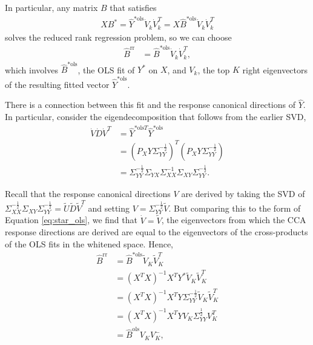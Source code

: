 \documentclass{article}
\begin{document}
In particular, any matrix $B$ that satisfies
\begin{align*}
  XB^{\ast} = \hat{Y}^{\ast \text{ols}}\dot{V}_{k}\dot{V}_{k}^{T} = X\hat{B}^{\ast \text{ols}}\dot{V}_{k}\dot{V}_{k}^{T}
\end{align*}
solves the reduced rank regression problem, so we can choose
\begin{align}
  \hat{B}^{\text{rr}} &= \hat{B}^{\ast \text{ols}}\dot{V}_{k}\dot{V}_{k}^{T}, \label{eq:brr_coef}
\end{align}
which involves $\hat{B}^{\ast \text{ols}}$, the OLS fit of $Y^{\ast}$ on $X$, and
$V_{k}$, the top $K$ right eigenvectors of the resulting fitted vector
$\hat{Y}^{\ast \text{ols}}$.

There is a connection between this fit and the response canonical directions of
$\hat{Y}$. In particular, consider the eigendecomposition that follows from the
earlier SVD,
\begin{align}
\dot{V}\dot{D}\dot{V}^{T} &=   \hat{Y}^{\ast \text{ols} T}  \hat{Y}^{\ast \text{ols}} \nonumber \\
&= \left(P_{X}Y\Sigma_{YY}^{-\frac{1}{2}}\right)^{T}\left(P_{X}Y\Sigma_{YY}^{-\frac{1}{2}}\right)\nonumber \\
  &= \Sigma_{YY}^{-\frac{1}{2}}\Sigma_{YX} \Sigma_{XX}^{-1}\Sigma_{XY}\Sigma_{YY}^{-\frac{1}{2}}. \label{eq:star_ols}
\end{align}

Recall that the response canonical directions $V$ are derived by taking the SVD
of $\Sigma_{XX}^{-\frac{1}{2}}\Sigma_{XY}\Sigma_{YY}^{-\frac{1}{2}} =
\tilde{U}\tilde{D}\tilde{V}^{T}$ and setting $V =
\Sigma_{YY}^{-\frac{1}{2}}\tilde{V}$. But comparing this to the form of Equation
\ref{eq:star_ols}, we find that $\dot{V} = \tilde{V}$, the eigenvectors from
which the CCA response directions are derived are equal to the eigenvectors of
the cross-products of the OLS fits in the whitened space. Hence,
\begin{align*}
\hat{B}^{\text{rr}} &= \hat{B}^{\ast \text{ols}}\tilde{V}_{K}\tilde{V}_{K}^{T} \\
&= \left(X^{T}X\right)^{-1}X^{T}Y^{\ast}\tilde{V}_{K}\tilde{V}_{K}^{T} \\
&= \left(X^{T}X\right)^{-1}X^{T}Y\Sigma_{YY}^{-\frac{1}{2}}\tilde{V}_{K}\tilde{V}_{K}^{T} \\
&= \left(X^{T}X\right)^{-1}X^{T}Y V_{K} \Sigma_{YY}^{\frac{1}{2}}V_{K}^{T} \\
&= \hat{B}^{\text{ols}}V_{K}V_{K}^{-},
\end{align*}
\end{document}
